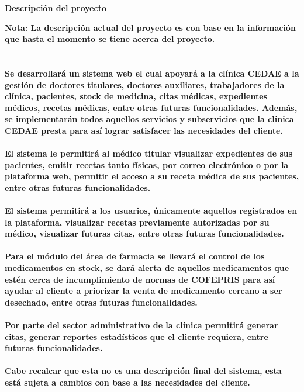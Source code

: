 \documentclass[12pt,letterpaper]{article}
\begin{document}
    \newpage
	\pagestyle{plain}
	{
		\par\vspace{0cm}
		{
			\begin{center}

					\Huge\textbf
					{
						Descripción del proyecto
					}
			\end{center}
		}
		\par\vspace{0cm}
		{
			\normalsize\textbf
			{
                \justify
                Nota: La descripción actual del proyecto es con base en la información que hasta el 
                momento se tiene acerca del proyecto.
                \\\\\\
                Se desarrollará un sistema web el cual apoyará a la clínica CEDAE a la gestión de doctores titulares,
                doctores auxiliares, trabajadores de la clínica, pacientes, stock de medicina, citas médicas, expedientes médicos,
                recetas médicas, entre otras futuras funcionalidades.
                Además, se implementarán todos aquellos servicios y subservicios que la clínica CEDAE presta para así lograr satisfacer
                las necesidades del cliente.
                \\\\
                El sistema le permitirá al médico titular visualizar expedientes de sus pacientes, emitir recetas tanto físicas,
                por correo electrónico o por la plataforma web, permitir el acceso a su receta médica de sus pacientes, entre otras futuras funcionalidades.
                \\\\
                El sistema permitirá a los usuarios, únicamente aquellos registrados en la plataforma, visualizar recetas previamente autorizadas por 
                su médico, visualizar futuras citas, entre otras futuras funcionalidades.
                \\\\
                Para el módulo del área de farmacia se llevará el control de los medicamentos en stock, se dará alerta de aquellos medicamentos que estén cerca de incumplimiento 
                de normas de COFEPRIS para así ayudar al cliente a priorizar la venta de medicamento cercano a ser desechado, entre otras futuras funcionalidades.
                \\\\
                Por parte del sector administrativo de la clínica permitirá generar citas, generar reportes estadísticos que el cliente requiera, entre futuras funcionalidades.
                \\\\
                Cabe recalcar que esta no es una descripción final del sistema, esta está sujeta a cambios con base a las necesidades del cliente. 
			}
		}
    }
    
\end{document}
